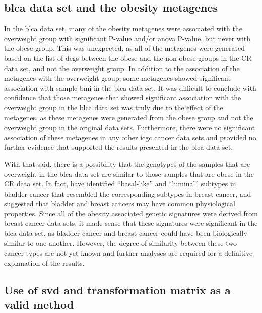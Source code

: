 \subsection{\Gls{blca} data set and the obesity metagenes}
\label{sub:blca_and_obesity_metagenes}

In the \gls{blca} data set, many of the obesity metagenes were associated with the overweight group with significant P-value and/or \gls{anova} P-value, but never with the obese group.
This was unexpected, as all of the metagenes were generated based on the list of \glspl{deg} between the obese and the non-obese groups in the CR data set, and not the overweight group.
In addition to the association of the metagenes with the overweight group, some metagenes showed significant association with sample \gls{bmi} in the \gls{blca} data set.
It was difficult to conclude with confidence that those metagenes that showed significant association with the overweight group in the \gls{blca} data set was truly due to the effect of the metagenes, as these metagenes were generated from the obese group and not the overweight group in the original data sets.
Furthermore, there were no significant association of these metagenes in any other \gls{icgc} cancer data sets and provided no further evidence that supported the results presented in the \gls{blca} data set.

With that said, there is a possibility that the genotypes of the samples that are overweight in the \gls{blca} data set are similar to those samples that are obese in the CR data set.
In fact, \citet{Damrauer2014} have identified ``basal-like'' and ``luminal''  subtypes in bladder cancer that resembled the corresponding subtypes in breast cancer, and suggested that bladder  and breast cancers may have common physiological properties.
Since all of the obesity associated genetic signatures were derived from breast cancer data sets, it made sense that these signatures were significant in the \gls{blca} data set, as bladder cancer and breast cancer could have been biologically similar to one another.
However, the degree of similarity between these two cancer types are not yet known and further analyses are required for a definitive explanation of the results.

\subsection{Use of \gls{svd} and transformation matrix as a valid method}
\label{sub:use_of_svd_and_transformation_matrix_as_a_valid_method}

